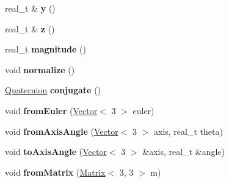 \begin{DoxyCompactItemize}
\item 
\hypertarget{classetk_1_1_quaternion_ac634a76e0c094848057a1535ff710e94}{real\-\_\-t \& {\bfseries y} ()}\label{classetk_1_1_quaternion_ac634a76e0c094848057a1535ff710e94}

\item 
\hypertarget{classetk_1_1_quaternion_a639facd98b42a02de0527a0ab15861f6}{real\-\_\-t \& {\bfseries z} ()}\label{classetk_1_1_quaternion_a639facd98b42a02de0527a0ab15861f6}

\item 
\hypertarget{classetk_1_1_quaternion_a11f9a03abdee0137bf59d29a05d904ed}{real\-\_\-t {\bfseries magnitude} ()}\label{classetk_1_1_quaternion_a11f9a03abdee0137bf59d29a05d904ed}

\item 
\hypertarget{classetk_1_1_quaternion_a2fea07c80f64acf916c4141068d4dc4d}{void {\bfseries normalize} ()}\label{classetk_1_1_quaternion_a2fea07c80f64acf916c4141068d4dc4d}

\item 
\hypertarget{classetk_1_1_quaternion_ad5fa5e5d2edbcee852480e63053daf80}{\hyperlink{classetk_1_1_quaternion}{Quaternion} {\bfseries conjugate} ()}\label{classetk_1_1_quaternion_ad5fa5e5d2edbcee852480e63053daf80}

\item 
\hypertarget{classetk_1_1_quaternion_ae191a92873826ad1de7495810a0ed1a9}{void {\bfseries from\-Euler} (\hyperlink{classetk_1_1_vector}{Vector}$<$ 3 $>$ euler)}\label{classetk_1_1_quaternion_ae191a92873826ad1de7495810a0ed1a9}

\item 
\hypertarget{classetk_1_1_quaternion_a821b782603974f5ba3652f6f585cff04}{void {\bfseries from\-Axis\-Angle} (\hyperlink{classetk_1_1_vector}{Vector}$<$ 3 $>$ axis, real\-\_\-t theta)}\label{classetk_1_1_quaternion_a821b782603974f5ba3652f6f585cff04}

\item 
\hypertarget{classetk_1_1_quaternion_a061e0f229b3b5730a54a47e9d325458f}{void {\bfseries to\-Axis\-Angle} (\hyperlink{classetk_1_1_vector}{Vector}$<$ 3 $>$ \&axis, real\-\_\-t \&angle)}\label{classetk_1_1_quaternion_a061e0f229b3b5730a54a47e9d325458f}

\item 
\hypertarget{classetk_1_1_quaternion_a6dd99f266dfb3338e9fa3a61fac8b046}{void {\bfseries from\-Matrix} (\hyperlink{classetk_1_1_matrix}{Matrix}$<$ 3, 3 $>$ m)}\label{classetk_1_1_quaternion_a6dd99f266dfb3338e9fa3a61fac8b046}


\end{DoxyCompactItemize}
